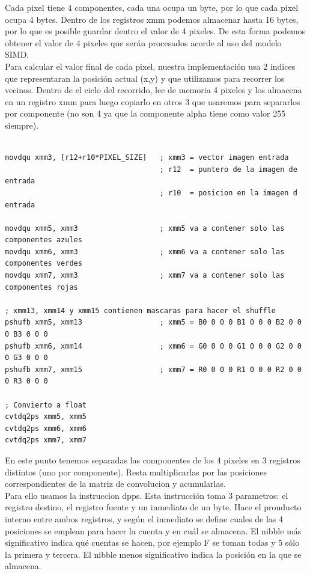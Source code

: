\documentclass[10pt,a4paper,spanish]{article}
\begin{document}
Cada pixel tiene 4 componentes, cada una ocupa un byte, por lo que cada pixel ocupa 4 bytes. Dentro de los registros xmm podemos almacenar hasta 16 bytes, por lo que es posible guardar dentro el valor de 4 pixeles. De esta forma podemos obtener el valor de 4 pixeles que serán procesados acorde al uso del modelo SIMD. \\

Para calcular el valor final de cada pixel, nuestra implementación usa 2 indices que representaran la posición actual (x,y) y que utilizamos para recorrer los vecinos. Dentro de el ciclo del recorrido, lee de memoria 4 pixeles y los almacena en un registro xmm para luego copiarlo en otros 3 que usaremos para separarlos por componente (no son 4 ya que la componente alpha tiene como valor 255 siempre).

\begin{codesnippet}
\begin{verbatim}
	
movdqu xmm3, [r12+r10*PIXEL_SIZE]   ; xmm3 = vector imagen entrada
                                    ; r12  = puntero de la imagen de entrada
                                    ; r10  = posicion en la imagen d entrada

movdqu xmm5, xmm3                   ; xmm5 va a contener solo las componentes azules
movdqu xmm6, xmm3                   ; xmm6 va a contener solo las componentes verdes
movdqu xmm7, xmm3                   ; xmm7 va a contener solo las componentes rojas	

; xmm13, xmm14 y xmm15 contienen mascaras para hacer el shuffle
pshufb xmm5, xmm13                  ; xmm5 = B0 0 0 0 B1 0 0 0 B2 0 0 0 B3 0 0 0
pshufb xmm6, xmm14                  ; xmm6 = G0 0 0 0 G1 0 0 0 G2 0 0 0 G3 0 0 0
pshufb xmm7, xmm15                  ; xmm7 = R0 0 0 0 R1 0 0 0 R2 0 0 0 R3 0 0 0

; Convierto a float
cvtdq2ps xmm5, xmm5
cvtdq2ps xmm6, xmm6
cvtdq2ps xmm7, xmm7

\end{verbatim}
\end{codesnippet}

En este punto tenemos separadas las componentes de los 4 pixeles en 3 registros distintos (uno por componente). Resta multiplicarlas por las posiciones correspondientes de la matriz de convolucion y acumularlas. \\

Para ello usamos la instruccion dpps. Esta instrucción toma 3 parametros: el registro destino, el registro fuente y un inmediato de un byte. Hace el prouducto interno entre ambos registros, y según el inmediato se define cuales de las 4 posiciones se emplean para hacer la cuenta y en cuál se almacena. El nibble más significativo indica qué cuentas se hacen, por ejemplo F se toman todas y 5 sólo la primera y tercera. El nibble menos significativo indica la posición en la que se almacena. \\
\end{document}
